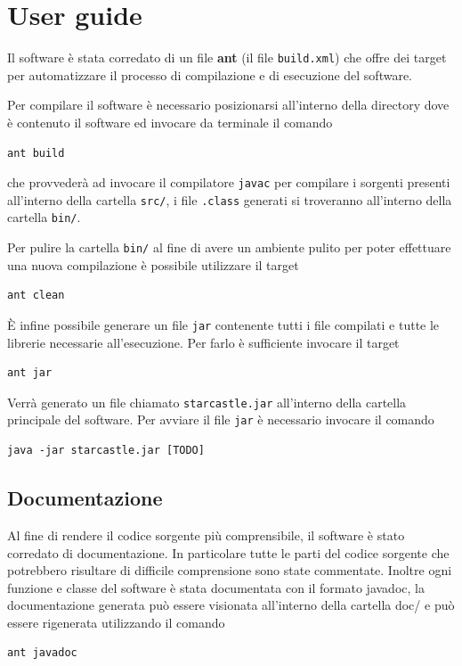 \documentclass[a4paper,12pt]{article}
\begin{document}
\section{User guide}
\label{sec:guide}

Il software \`e stata corredato di un file \textbf{ant} (il file \texttt{build.xml}) che offre dei target per automatizzare il processo di compilazione e di esecuzione del software.

Per compilare il software \`e necessario posizionarsi all'interno della directory dove \`e contenuto il software ed invocare da terminale il comando

\begin{lstlisting}[basicstyle=\ttfamily]
ant build
\end{lstlisting}

che provveder\`a ad invocare il compilatore \texttt{javac} per compilare i sorgenti presenti all'interno della cartella \texttt{src/}, i file \texttt{.class} generati si troveranno all'interno della cartella \texttt{bin/}. 

Per pulire la cartella \texttt{bin/} al fine di avere un ambiente pulito per poter effettuare una nuova compilazione \`e possibile utilizzare il target
\begin{lstlisting}[basicstyle=\ttfamily]
ant clean
\end{lstlisting}

\`E infine possibile generare un file \texttt{jar} contenente tutti i file compilati e tutte le librerie necessarie all'esecuzione. Per farlo \`e sufficiente invocare il target
\begin{lstlisting}[basicstyle=\ttfamily]
ant jar
\end{lstlisting}
Verr\`a generato un file chiamato \texttt{starcastle.jar} all'interno della cartella principale del software.
Per avviare il file \texttt{jar} \`e necessario invocare il comando
\begin{lstlisting}[basicstyle=\ttfamily]
java -jar starcastle.jar [TODO]
\end{lstlisting}

\subsection{Documentazione}

Al fine di rendere il codice sorgente pi\`u comprensibile, il software \`e stato corredato di documentazione. In particolare tutte le parti del codice sorgente che potrebbero risultare di difficile comprensione sono state commentate. Inoltre ogni funzione e classe del software \`e stata documentata con il formato \textsf {javadoc}, la documentazione generata pu\`o essere visionata all'interno della cartella \textsf{doc/} e pu\`o essere rigenerata utilizzando il comando
\begin{lstlisting}[basicstyle=\ttfamily]
ant javadoc
\end{lstlisting}
\end{document}
